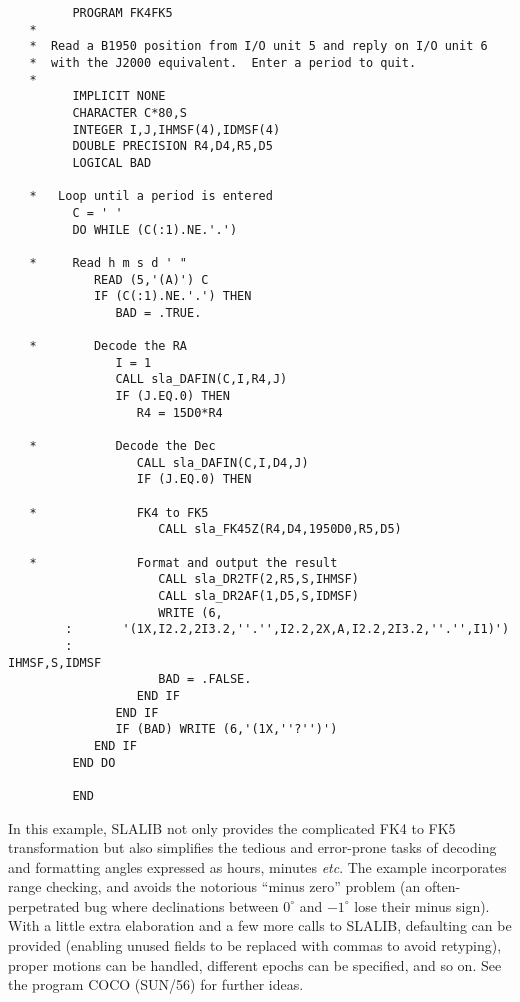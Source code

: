 \documentclass[11pt,twoside]{article}
\begin{document}
\begin{verbatim}
         PROGRAM FK4FK5
   *
   *  Read a B1950 position from I/O unit 5 and reply on I/O unit 6
   *  with the J2000 equivalent.  Enter a period to quit.
   *
         IMPLICIT NONE
         CHARACTER C*80,S
         INTEGER I,J,IHMSF(4),IDMSF(4)
         DOUBLE PRECISION R4,D4,R5,D5
         LOGICAL BAD

   *   Loop until a period is entered
         C = ' '
         DO WHILE (C(:1).NE.'.')

   *     Read h m s d ' "
            READ (5,'(A)') C
            IF (C(:1).NE.'.') THEN
               BAD = .TRUE.

   *        Decode the RA
               I = 1
               CALL sla_DAFIN(C,I,R4,J)
               IF (J.EQ.0) THEN
                  R4 = 15D0*R4

   *           Decode the Dec
                  CALL sla_DAFIN(C,I,D4,J)
                  IF (J.EQ.0) THEN

   *              FK4 to FK5
                     CALL sla_FK45Z(R4,D4,1950D0,R5,D5)

   *              Format and output the result
                     CALL sla_DR2TF(2,R5,S,IHMSF)
                     CALL sla_DR2AF(1,D5,S,IDMSF)
                     WRITE (6,
        :       '(1X,I2.2,2I3.2,''.'',I2.2,2X,A,I2.2,2I3.2,''.'',I1)')
        :                                                     IHMSF,S,IDMSF
                     BAD = .FALSE.
                  END IF
               END IF
               IF (BAD) WRITE (6,'(1X,''?'')')
            END IF
         END DO

         END
\end{verbatim}
In this example, SLALIB not only provides the complicated FK4 to
FK5 transformation but also
simplifies the tedious and error-prone tasks
of decoding and formatting angles
expressed as hours, minutes {\it etc}.  The
example incorporates range checking, and avoids the
notorious ``minus zero'' problem (an often-perpetrated bug where
declinations between $0^{\circ}$ and $-1^{\circ}$ lose their minus
sign).
With a little extra elaboration and a few more calls to SLALIB,
defaulting can be provided (enabling unused fields to
be replaced with commas to avoid retyping), proper motions
can be handled, different epochs can be specified, and
so on.  See the program COCO (SUN/56) for further ideas.
\end{document}
